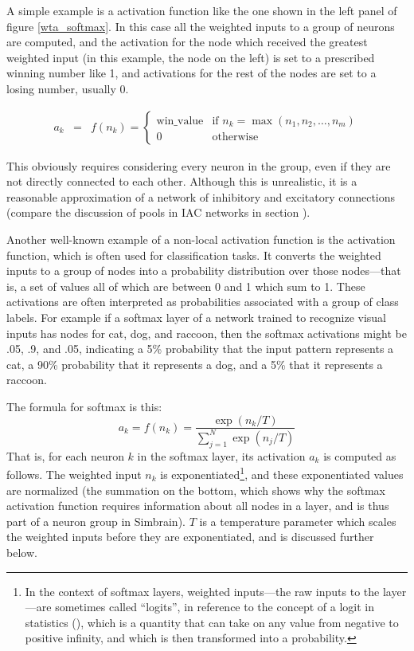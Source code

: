 A simple example is a  activation function like the one shown in the left panel of figure \ref{wta_softmax}. In this case all the weighted inputs to a group of neurons are computed, and the activation for the node which received the greatest weighted input (in this example, the node on the left) is set to a prescribed winning number like 1, and activations for the rest of the nodes are set to a losing number, usually 0.

\begin{eqnarray*}
a_k &=& f(n_k) =
\begin{cases}
    \text{win\_value} & \text{if } n_k = \max(n_1, n_2, \dots, n_m) \\
    0 & \text{otherwise}
\end{cases}
\end{eqnarray*}

This obviously requires considering every neuron in the group, even if they are not directly connected to each other.  Although this is unrealistic, it is a reasonable approximation of a network of inhibitory and excitatory connections  (compare the discussion of pools in IAC networks in section ).

Another well-known example of a non-local activation function is the  activation function, which is often used for classification tasks. It converts the weighted inputs to a group of nodes into a probability distribution over those nodes---that is, a set of values all of which are between 0 and 1 which sum to 1.   These activations are often interpreted as probabilities associated with a group of class labels. For example if a softmax layer of a network trained to recognize visual inputs has nodes for cat, dog, and raccoon, then the softmax activations might be .05, .9, and .05, indicating a 5\% probability that the input pattern represents a cat, a 90\% probability that it represents a dog, and a 5\% that it represents a raccoon.

The formula for softmax is this:
\begin{equation*}
a_k = f(n_k)
   = \frac{\exp\left(n_k/T\right)}
          {\displaystyle{\sum_{j=1}^N}\exp\left(n_j/T\right)}
\end{equation*}
That is, for each neuron $k$ in the softmax layer, its activation $a_k$ is computed as follows. The weighted input $n_k$ is exponentiated\footnote{In the context of softmax layers, weighted inputs---the raw inputs to the layer---are sometimes called ``logits'', in reference to the concept of a logit in statistics (), which is a quantity that can take on any value from negative to positive infinity, and which is then transformed into a probability.}, and these exponentiated values are normalized (the summation on the bottom, which shows why the softmax activation function requires information about all nodes in a layer, and is thus part of a neuron group in Simbrain). $T$ is a temperature parameter which scales the weighted inputs before they are exponentiated, and is discussed further below.

